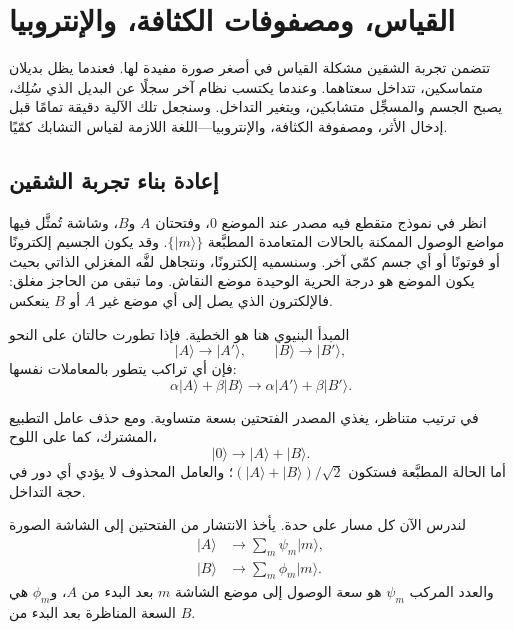 \chapter{القياس، ومصفوفات الكثافة، والإنتروبيا}

تتضمن تجربة الشقين مشكلة القياس في أصغر صورة مفيدة لها. فعندما يظل بديلان متماسكين، تتداخل سعتاهما. وعندما يكتسب نظام آخر سجلًا عن البديل الذي سُلِك، يصبح الجسم والمسجِّل متشابكين، ويتغير التداخل. وسنجعل تلك الآلية دقيقة تمامًا قبل إدخال الأثر، ومصفوفة الكثافة، والإنتروبيا---اللغة اللازمة لقياس التشابك كمّيًا.

\section{إعادة بناء تجربة الشقين}

انظر في نموذج متقطع فيه مصدر عند الموضع \(0\)، وفتحتان \(A\) و\(B\)، وشاشة تُمثَّل فيها مواضع الوصول الممكنة بالحالات المتعامدة المطبَّعة \(\{|m\rangle\}\). وقد يكون الجسيم إلكترونًا أو فوتونًا أو أي جسم كمّي آخر. وسنسميه إلكترونًا، ونتجاهل لفَّه المغزلي الذاتي بحيث يكون الموضع هو درجة الحرية الوحيدة موضع النقاش. وما تبقى من الحاجز مغلق: فالإلكترون الذي يصل إلى أي موضع غير \(A\) أو \(B\) ينعكس.

المبدأ البنيوي هنا هو الخطية. فإذا تطورت حالتان على النحو
\begin{equation}
|A\rangle\longrightarrow |A'\rangle,
\qquad
|B\rangle\longrightarrow |B'\rangle,
\end{equation}
فإن أي تراكب يتطور بالمعاملات نفسها:
\begin{equation}
\alpha|A\rangle+\beta|B\rangle
\longrightarrow
\alpha|A'\rangle+\beta|B'\rangle.
\end{equation}

في ترتيب متناظر، يغذي المصدر الفتحتين بسعة متساوية. ومع حذف عامل التطبيع المشترك، كما على اللوح،
\begin{equation}
|0\rangle\longrightarrow |A\rangle+|B\rangle.
\end{equation}
أما الحالة المطبَّعة فستكون \((|A\rangle+|B\rangle)/\sqrt{2}\)؛ والعامل المحذوف لا يؤدي أي دور في حجة التداخل.

لندرس الآن كل مسار على حدة. يأخذ الانتشار من الفتحتين إلى الشاشة الصورة
\begin{align}
|A\rangle &\longrightarrow \sum_m \psi_m|m\rangle, \\
|B\rangle &\longrightarrow \sum_m \phi_m|m\rangle.
\end{align}
والعدد المركب \(\psi_m\) هو سعة الوصول إلى موضع الشاشة \(m\) بعد البدء من \(A\)، و\(\phi_m\) هي السعة المناظرة بعد البدء من \(B\).

